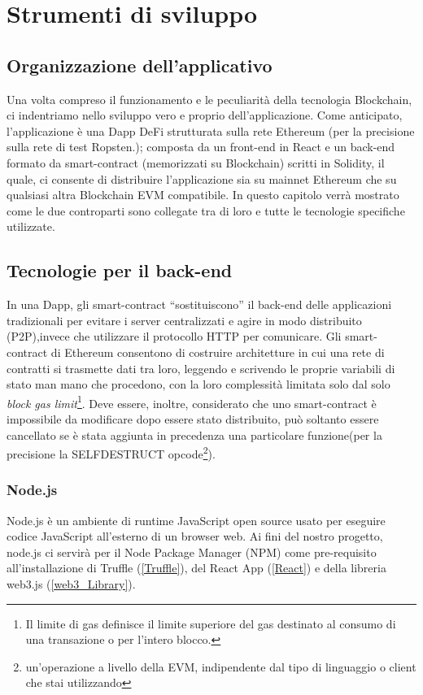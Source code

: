 
\chapter{Strumenti di sviluppo}\makeatletter{}\makeatother
\label{cap2}

\section{Organizzazione dell'applicativo}\label{Organizzazione}
Una volta compreso il funzionamento e le peculiarità della tecnologia Blockchain, ci indentriamo nello sviluppo vero e proprio dell'applicazione.
Come anticipato, l'applicazione è una Dapp DeFi strutturata sulla rete Ethereum (per la precisione sulla rete di test Ropsten.); composta da un front-end in React e un back-end formato da smart-contract (memorizzati su Blockchain) scritti in Solidity, il quale, ci consente di distribuire l'applicazione sia su mainnet Ethereum che su qualsiasi altra Blockchain EVM compatibile. In questo capitolo verrà mostrato come le due controparti sono collegate tra di loro e tutte le tecnologie specifiche utilizzate.

\section{Tecnologie per il back-end}\label{back-end}
In una Dapp, gli smart-contract “sostituiscono” il back-end delle applicazioni tradizionali per evitare i server centralizzati e agire in modo distribuito (P2P),invece che utilizzare il protocollo HTTP per comunicare.
Gli smart-contract di Ethereum consentono di costruire architetture in cui una rete di contratti si trasmette dati tra loro, leggendo e scrivendo le proprie variabili di stato man mano che procedono, con la loro complessità limitata solo dal solo \textit{block gas limit}\footnote{Il limite di gas definisce il limite superiore del gas destinato al consumo di una transazione o per l'intero blocco.}.
Deve essere, inoltre, considerato che uno smart-contract è impossibile da modificare dopo essere stato distribuito, può soltanto essere cancellato se è stata aggiunta in precedenza una particolare funzione(per la precisione la SELFDESTRUCT opcode\footnote{un'operazione a livello della EVM, indipendente dal tipo di linguaggio o client che stai utilizzando}).

\subsection{Node.js}\label{nodeJS}
Node.js è un ambiente di runtime JavaScript open source usato per eseguire codice JavaScript all'esterno di un browser web. Ai fini del nostro progetto, node.js ci servirà per il Node Package Manager (NPM) come pre-requisito all'installazione di Truffle (\ref{Truffle}), del React App (\ref{React}) e della libreria web3.js (\ref{web3_Library}). 
